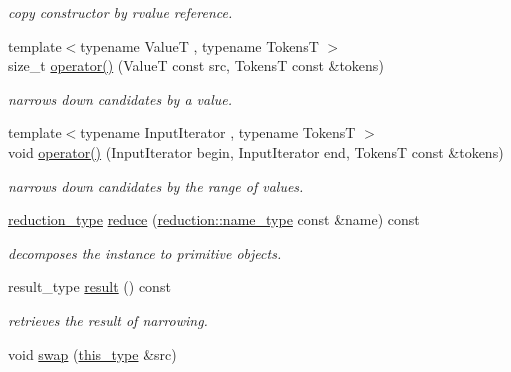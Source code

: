 \begin{DoxyCompactItemize}
\begin{DoxyCompactList}\small\item\em copy constructor by rvalue reference. \end{DoxyCompactList}\item 
{\footnotesize template$<$typename Value\-T , typename Tokens\-T $>$ }\\size\-\_\-t \hyperlink{classhryky_1_1_narrow_token_ada653c645c09f84ab73cec2ebcbc5a4c}{operator()} (Value\-T const src, Tokens\-T const \&tokens)
\begin{DoxyCompactList}\small\item\em narrows down candidates by a value. \end{DoxyCompactList}\item 
\hypertarget{classhryky_1_1_narrow_token_a6fe8945316c749abbed245cb7d3b8914}{{\footnotesize template$<$typename Input\-Iterator , typename Tokens\-T $>$ }\\void \hyperlink{classhryky_1_1_narrow_token_a6fe8945316c749abbed245cb7d3b8914}{operator()} (Input\-Iterator begin, Input\-Iterator end, Tokens\-T const \&tokens)}\label{classhryky_1_1_narrow_token_a6fe8945316c749abbed245cb7d3b8914}

\begin{DoxyCompactList}\small\item\em narrows down candidates by the range of values. \end{DoxyCompactList}\item 
\hypertarget{classhryky_1_1_narrow_token_a26077cf647e46c7482990337560504fa}{\hyperlink{namespacehryky_a343a9a4c36a586be5c2693156200eadc}{reduction\-\_\-type} \hyperlink{classhryky_1_1_narrow_token_a26077cf647e46c7482990337560504fa}{reduce} (\hyperlink{namespacehryky_1_1reduction_ac686c30a4c8d196bbd0f05629a6b921f}{reduction\-::name\-\_\-type} const \&name) const }\label{classhryky_1_1_narrow_token_a26077cf647e46c7482990337560504fa}

\begin{DoxyCompactList}\small\item\em decomposes the instance to primitive objects. \end{DoxyCompactList}\item 
\hypertarget{classhryky_1_1_narrow_token_af36664ab981d8d2616f8c0c99d145506}{result\-\_\-type \hyperlink{classhryky_1_1_narrow_token_af36664ab981d8d2616f8c0c99d145506}{result} () const }\label{classhryky_1_1_narrow_token_af36664ab981d8d2616f8c0c99d145506}

\begin{DoxyCompactList}\small\item\em retrieves the result of narrowing. \end{DoxyCompactList}\item 
\hypertarget{classhryky_1_1_narrow_token_a141661722b4c90ec9699fd9511c612ab}{void \hyperlink{classhryky_1_1_narrow_token_a141661722b4c90ec9699fd9511c612ab}{swap} (\hyperlink{classhryky_1_1_narrow_token_a8ef24a463e656c6201d12dc48d566c58}{this\-\_\-type} \&src)}\label{classhryky_1_1_narrow_token_a141661722b4c90ec9699fd9511c612ab}


\end{DoxyCompactItemize}
